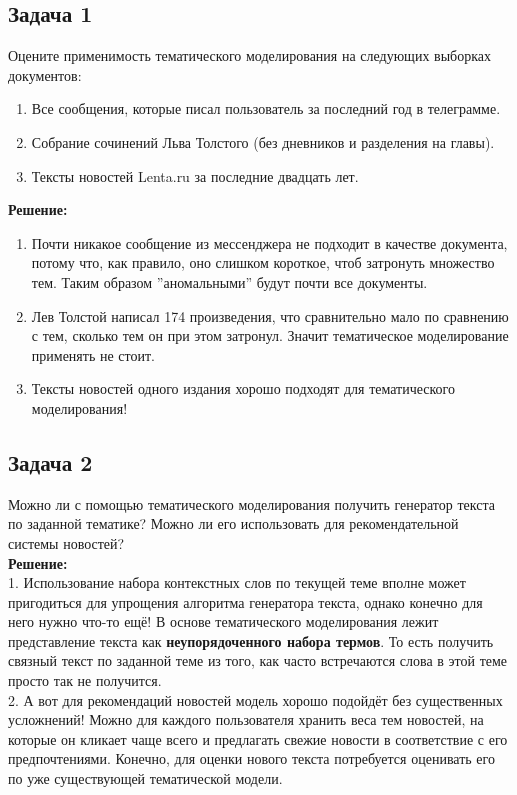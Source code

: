 \documentclass[a4paper, 12pt]{article}
\begin{document}
\subsection*{Задача 1}
Оцените применимость тематического моделирования на следующих выборках документов:
\begin{enumerate}
    \item Все сообщения, которые писал пользователь за последний год в телеграмме.
    \item Собрание сочинений Льва Толстого (без дневников и разделения на главы). 
    \item Тексты новостей Lenta.ru за последние двадцать лет.
\end{enumerate}
\textbf{Решение:}
\begin{enumerate}
    \item Почти никакое сообщение из мессенджера не подходит в качестве документа, потому что, как правило, оно слишком короткое, чтоб затронуть множество тем. Таким образом ''аномальными'' будут почти все документы. 
    \item Лев Толстой написал 174 произведения, что сравнительно мало по сравнению с тем, сколько тем он при этом затронул. Значит тематическое моделирование применять не стоит.
    \item Тексты новостей одного издания хорошо подходят для тематического моделирования!
\end{enumerate}


\subsection*{Задача 2}
Можно ли с помощью тематического моделирования получить генератор текста по заданной тематике? Можно ли его использовать для рекомендательной системы новостей?\\
\textbf{Решение:}\\
1. Использование набора контекстных слов по текущей теме вполне может пригодиться для упрощения алгоритма генератора текста, однако конечно для него нужно что-то ещё! В основе тематического моделирования лежит представление текста как \textbf{неупорядоченного набора термов}. То есть получить связный текст по заданной теме из того, как часто встречаются слова в этой теме просто так не получится. \\
2. А вот для рекомендаций новостей модель хорошо подойдёт без существенных усложнений! Можно для каждого пользователя хранить веса тем новостей, на которые он кликает чаще всего и предлагать свежие новости в соответствие с его предпочтениями. Конечно, для оценки нового текста потребуется оценивать его по уже существующей тематической модели.
\end{document}
